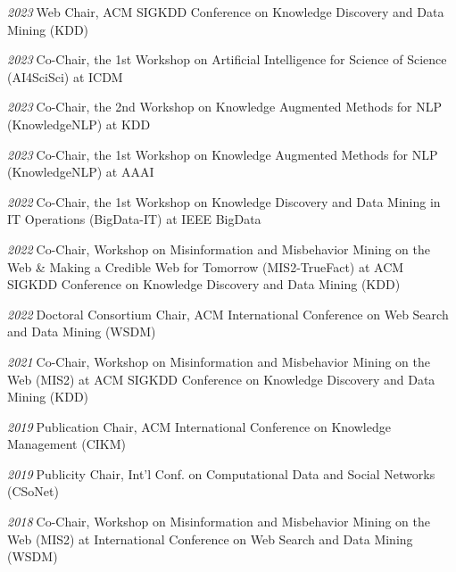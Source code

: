 \documentclass[10pt]{article}
\newenvironment{myindentpar}[1]%
{\begin{list}{}%
         {\setlength{\leftmargin}{#1}}%
         \item[]%
}
{\end{list}}
\newcounter{list}
\begin{document}
\begin{myindentpar}{0.75cm}
{\hspace{-0.75cm}\textit{2023}\textcolor{white}{.}Web Chair, ACM SIGKDD Conference on Knowledge Discovery and Data Mining (KDD)

\hspace{-0.75cm}\textit{2023}\textcolor{white}{.}Co-Chair, the 1st Workshop on Artificial Intelligence for Science of Science (AI4SciSci) at ICDM

\hspace{-0.75cm}\textit{2023}\textcolor{white}{.}Co-Chair, the 2nd Workshop on Knowledge Augmented Methods for NLP (KnowledgeNLP) at KDD

\hspace{-0.75cm}\textit{2023}\textcolor{white}{.}Co-Chair, the 1st Workshop on Knowledge Augmented Methods for NLP (KnowledgeNLP) at AAAI

\hspace{-0.75cm}\textit{2022}\textcolor{white}{.}Co-Chair, the 1st Workshop on Knowledge Discovery and Data Mining in IT Operations (BigData-IT) at IEEE BigData

\hspace{-0.75cm}\textit{2022}\textcolor{white}{.}Co-Chair, Workshop on Misinformation and Misbehavior Mining on the Web \& Making a Credible Web for Tomorrow (MIS2-TrueFact) at ACM SIGKDD Conference on Knowledge Discovery and Data Mining (KDD)

\hspace{-0.75cm}\textit{2022}\textcolor{white}{.}Doctoral Consortium Chair, ACM International Conference on Web Search and Data Mining (WSDM)

\hspace{-0.75cm}\textit{2021}\textcolor{white}{.}Co-Chair, Workshop on Misinformation and Misbehavior Mining on the Web (MIS2) at ACM SIGKDD Conference on Knowledge Discovery and Data Mining (KDD)

\hspace{-0.75cm}\textit{2019}\textcolor{white}{.}Publication Chair, ACM International Conference on Knowledge Management (CIKM)

\hspace{-0.75cm}\textit{2019}\textcolor{white}{.}Publicity Chair, Int'l Conf. on Computational Data and Social Networks (CSoNet)

\hspace{-0.75cm}\textit{2018}\textcolor{white}{.}Co-Chair, Workshop on Misinformation and Misbehavior Mining on the Web (MIS2) at International Conference on Web Search and Data Mining (WSDM)

}
\end{myindentpar}
\end{document}
